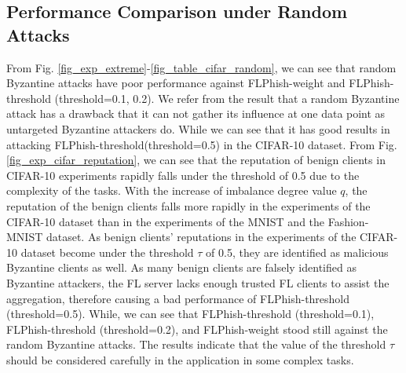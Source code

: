 \documentclass[journal]{IEEEtran}
\begin{document}
  \subsection{Performance Comparison under Random Attacks}
  From Fig. \ref{fig_exp_extreme}-\ref{fig_table_cifar_random}, we can see that random Byzantine attacks have poor performance against FLPhish-weight and FLPhish-threshold (threshold=0.1, 0.2). We refer from the result that a random Byzantine attack has a drawback that it can not gather its influence at one data point as untargeted Byzantine attackers do. While we can see that it has good results in attacking FLPhish-threshold(threshold=0.5) in the CIFAR-10 dataset. From Fig. \ref{fig_exp_cifar_reputation}, we can see that the reputation of benign clients in CIFAR-10 experiments rapidly falls under the threshold of 0.5 due to the complexity of the tasks. With the increase of imbalance degree value $q$, the reputation of the benign clients falls more rapidly in the experiments of the CIFAR-10 dataset than in the experiments of the MNIST and the Fashion-MNIST dataset. As benign clients' reputations in the experiments of the CIFAR-10 dataset become under the threshold $\tau$ of 0.5, they are identified as malicious Byzantine clients as well. As many benign clients are falsely identified as Byzantine attackers, the FL server lacks enough trusted FL clients to assist the aggregation, therefore causing a bad performance of FLPhish-threshold (threshold=0.5). While, we can see that FLPhish-threshold (threshold=0.1), FLPhish-threshold (threshold=0.2), and FLPhish-weight stood still against the random Byzantine attacks. The results indicate that the value of the threshold $\tau$ should be considered carefully in the application in some complex tasks.
\end{document}
